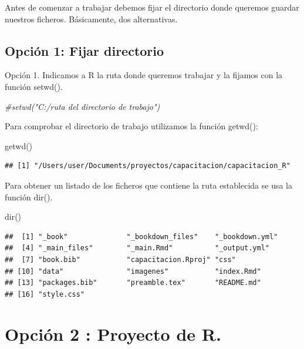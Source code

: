 \documentclass[
]{book}
\newenvironment{Shaded}{\begin{snugshade}}{\end{snugshade}}
\newcommand{\CommentTok}[1]{\textcolor[rgb]{0.56,0.35,0.01}{\textit{#1}}}
\newcommand{\FunctionTok}[1]{\textcolor[rgb]{0.00,0.00,0.00}{#1}}
\newcommand{\NormalTok}[1]{#1}
\begin{document}
Antes de comenzar a trabajar debemos fijar el directorio donde queremos guardar nuestros ficheros. Básicamente, dos alternativas.

\hypertarget{opciuxf3n-1-fijar-directorio}{%
\subsection{Opción 1: Fijar directorio}\label{opciuxf3n-1-fijar-directorio}}

Opción 1. Indicamos a R la ruta donde queremos trabajar y la fijamos con la función setwd().

\begin{Shaded}
\begin{Highlighting}[]
\CommentTok{\#setwd("C:/ruta del directorio de trabajo")}
\end{Highlighting}
\end{Shaded}

Para comprobar el directorio de trabajo utilizamos la función getwd():

\begin{Shaded}
\begin{Highlighting}[]
\FunctionTok{getwd}\NormalTok{()}
\end{Highlighting}
\end{Shaded}

\begin{verbatim}
## [1] "/Users/user/Documents/proyectos/capacitacion/capacitacion_R"
\end{verbatim}

Para obtener un listado de los ficheros que contiene la ruta establecida se usa la función dir().

\begin{Shaded}
\begin{Highlighting}[]
\FunctionTok{dir}\NormalTok{()}
\end{Highlighting}
\end{Shaded}

\begin{verbatim}
##  [1] "_book"              "_bookdown_files"    "_bookdown.yml"     
##  [4] "_main_files"        "_main.Rmd"          "_output.yml"       
##  [7] "book.bib"           "capacitacion.Rproj" "css"               
## [10] "data"               "imagenes"           "index.Rmd"         
## [13] "packages.bib"       "preamble.tex"       "README.md"         
## [16] "style.css"
\end{verbatim}

\hypertarget{opciuxf3n-2-proyecto-de-r.}{%
\section{Opción 2 : Proyecto de R.}\label{opciuxf3n-2-proyecto-de-r.}}
\end{document}
